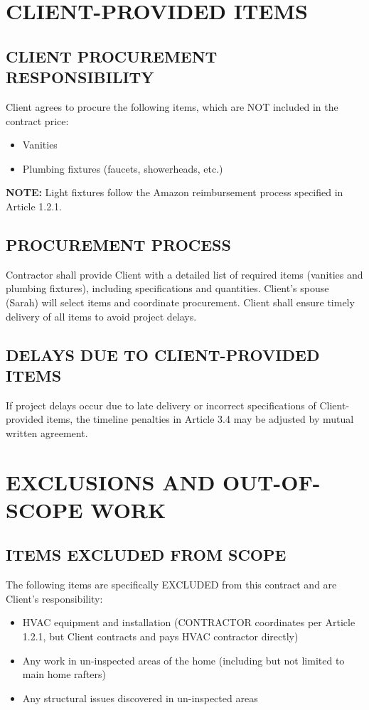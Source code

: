 \documentclass[10pt,letterpaper]{article}
\begin{document}
\section{CLIENT-PROVIDED ITEMS}

\subsection{CLIENT PROCUREMENT RESPONSIBILITY}
Client agrees to procure the following items, which are NOT included in the contract price:
\begin{itemize}[leftmargin=*]
\item Vanities
\item Plumbing fixtures (faucets, showerheads, etc.)
\end{itemize}

\noindent\textbf{NOTE:} Light fixtures follow the Amazon reimbursement process specified in Article 1.2.1.

\subsection{PROCUREMENT PROCESS}
Contractor shall provide Client with a detailed list of required items (vanities and plumbing fixtures), including specifications and quantities. Client's spouse (Sarah) will select items and coordinate procurement. Client shall ensure timely delivery of all items to avoid project delays.

\subsection{DELAYS DUE TO CLIENT-PROVIDED ITEMS}
If project delays occur due to late delivery or incorrect specifications of Client-provided items, the timeline penalties in Article 3.4 may be adjusted by mutual written agreement.

\section{EXCLUSIONS AND OUT-OF-SCOPE WORK}

\subsection{ITEMS EXCLUDED FROM SCOPE}
The following items are specifically EXCLUDED from this contract and are Client's responsibility:

\begin{itemize}[leftmargin=*]
\item HVAC equipment and installation (CONTRACTOR coordinates per Article 1.2.1, but Client contracts and pays HVAC contractor directly)
\item Any work in un-inspected areas of the home (including but not limited to main home rafters)
\item Any structural issues discovered in un-inspected areas
\end{itemize}
\end{document}

